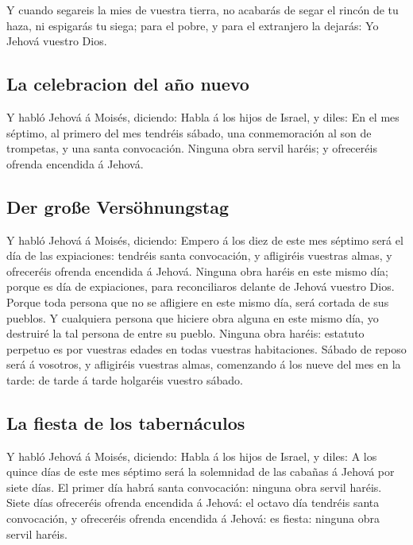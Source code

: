  Y cuando segareis la mies de vuestra tierra, no acabarás
de segar el rincón de tu haza, ni espigarás tu siega; para el pobre, y
para el extranjero la dejarás: Yo Jehová vuestro Dios.

\hypertarget{la-celebracion-del-auxf1o-nuevo}{%
\subsection{La celebracion del año
nuevo}\label{la-celebracion-del-auxf1o-nuevo}}

 Y habló Jehová á Moisés, diciendo:  Habla á
los hijos de Israel, y diles: En el mes séptimo, al primero del mes
tendréis sábado, una conmemoración al son de trompetas, y una santa
convocación.  Ninguna obra servil haréis; y ofreceréis
ofrenda encendida á Jehová.

\hypertarget{der-grouxdfe-versuxf6hnungstag}{%
\subsection{Der große
Versöhnungstag}\label{der-grouxdfe-versuxf6hnungstag}}

 Y habló Jehová á Moisés, diciendo:  Empero á
los diez de este mes séptimo será el día de las expiaciones: tendréis
santa convocación, y afligiréis vuestras almas, y ofreceréis ofrenda
encendida á Jehová.  Ninguna obra haréis en este mismo día;
porque es día de expiaciones, para reconciliaros delante de Jehová
vuestro Dios.  Porque toda persona que no se afligiere en
este mismo día, será cortada de sus pueblos.  Y cualquiera
persona que hiciere obra alguna en este mismo día, yo destruiré la tal
persona de entre su pueblo.  Ninguna obra haréis: estatuto
perpetuo es por vuestras edades en todas vuestras habitaciones.
 Sábado de reposo será á vosotros, y afligiréis vuestras
almas, comenzando á los nueve del mes en la tarde: de tarde á tarde
holgaréis vuestro sábado.

\hypertarget{la-fiesta-de-los-tabernuxe1culos}{%
\subsection{La fiesta de los
tabernáculos}\label{la-fiesta-de-los-tabernuxe1culos}}

 Y habló Jehová á Moisés, diciendo:  Habla á
los hijos de Israel, y diles: A los quince días de este mes séptimo será
la solemnidad de las cabañas á Jehová por siete días.  El
primer día habrá santa convocación: ninguna obra servil haréis.
 Siete días ofreceréis ofrenda encendida á Jehová: el
octavo día tendréis santa convocación, y ofreceréis ofrenda encendida á
Jehová: es fiesta: ninguna obra servil haréis.


